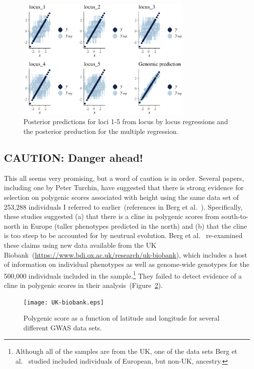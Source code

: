 \documentclass[12pt]{article}
\begin{document}
\begin{figure}
  \begin{center}
    \includegraphics[height=6cm]{genomic-prediction-multiple.eps}
  \end{center}
  \caption{Posterior predictions for loci 1-5 from locus by locus
    regressions and the posterior preduction for the multiple
    regression.}\label{fig:multiple}
\end{figure}

\subsection*{CAUTION: Danger ahead!}

This all seems very promising, but a word of caution is in
order. Several papers, including one by Peter Turchin, have suggested
that there is strong evidence for selection on polygenic scores
associated with height using the same data set of 253,288 individuals
I referred to earlier~(references in Berg et
al.~\cite{Berg-etal-2018}). Specifically, these studies suggested (a)
that there is a cline in polygenic scores from south-to-north in
Europe (taller phenotypes predicted in the north) and (b) that the
cline is too steep to be accounted for by neutrual evolution. Berg et
al.~\cite{Berg-etal-2018} re-examined these claims using new data
available from the UK
Biobank~(\url{https://www.bdi.ox.ac.uk/research/uk-biobank}), which
includes a host of information on individual phenotypes as well as
genome-wide genotypes for the 500,000 individuals included in the
sample.\footnote{Although all of the samples are from the UK, one of
  the data sets Berg et al.~\cite{Berg-etal-2018} studied included
  individuals of European, but non-UK, ancestry.} They failed to
detect evidence of a cline in polygenic scores in their
analysis~(Figure~\ref{fig:UK-biobank}).

\begin{figure}
  \begin{center}
    \texttt{[image: UK-biobank.eps]}
  \end{center}
  \caption{Polygenic score as a function of latitude and longitude for
    several different GWAS data sets.}\label{fig:UK-biobank}
\end{figure}
\end{document}
